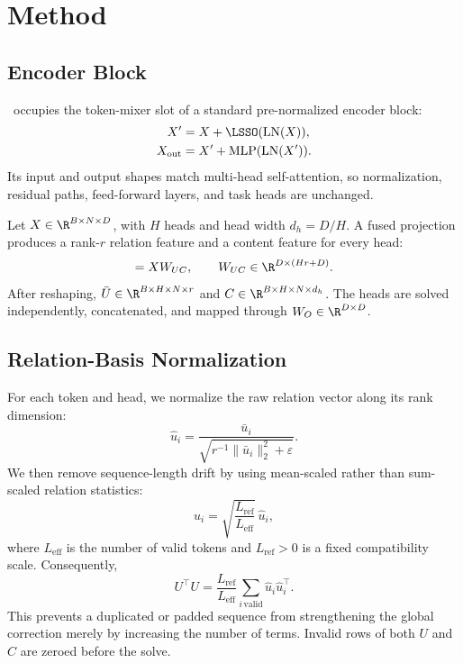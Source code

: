 \section{Method}
\label{sec:method}

\subsection{Encoder Block}

\LSSO\ occupies the token-mixer slot of a standard pre-normalized encoder block:
\begin{align}
  X' &= X + \LSSO(\operatorname{LN}(X)),\\
  X_{\mathrm{out}} &= X' + \operatorname{MLP}(\operatorname{LN}(X')).
\end{align}
Its input and output shapes match multi-head self-attention, so normalization, residual paths, feed-forward layers, and task heads are unchanged.

Let $X\in\R^{B\times N\times D}$, with $H$ heads and head width $d_h=D/H$. A fused projection produces a rank-$r$ relation feature and a content feature for every head:
\begin{equation}
  [\bar U,C]=XW_{UC},
  \qquad
  W_{UC}\in\R^{D\times(Hr+D)}.
\end{equation}
After reshaping, $\bar U\in\R^{B\times H\times N\times r}$ and $C\in\R^{B\times H\times N\times d_h}$. The heads are solved independently, concatenated, and mapped through $W_O\in\R^{D\times D}$.

\subsection{Relation-Basis Normalization}

For each token and head, we normalize the raw relation vector along its rank dimension:
\begin{equation}
  \widehat u_i
  =\frac{\bar u_i}
  {\sqrt{r^{-1}\lVert\bar u_i\rVert_2^2+\varepsilon}}.
  \label{eq:rms_norm}
\end{equation}
We then remove sequence-length drift by using mean-scaled rather than sum-scaled relation statistics:
\begin{equation}
  u_i=\sqrt{\frac{L_{\mathrm{ref}}}{L_{\mathrm{eff}}}}\,\widehat u_i,
  \label{eq:length_norm}
\end{equation}
where $L_{\mathrm{eff}}$ is the number of valid tokens and $L_{\mathrm{ref}}>0$ is a fixed compatibility scale. Consequently,
\[
  U^\top U
  =\frac{L_{\mathrm{ref}}}{L_{\mathrm{eff}}}
  \sum_{i\,\mathrm{valid}}\widehat u_i\widehat u_i^\top.
\]
This prevents a duplicated or padded sequence from strengthening the global correction merely by increasing the number of terms. Invalid rows of both $U$ and $C$ are zeroed before the solve.

